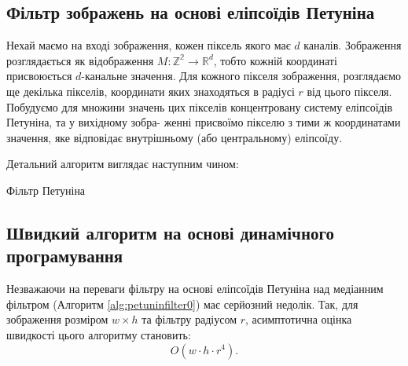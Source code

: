 \subsection{Фільтр зображень на основі еліпсоїдів Петуніна}

Нехай маємо на вході зображення, кожен піксель якого має \(d\) каналів. Зображення розглядається як відображення \(M: \mathbb{Z^2} \rightarrow \mathbb{R}^d\), тобто кожній координаті присвоюється \(d\)-канальне значення. Для кожного пікселя зображення, розглядаємо ще декілька пікселів, координати яких знаходяться в радіусі \(r\) від цього пікселя. Побудуємо для множини значень цих пікселів концентровану систему еліпсоїдів Петуніна, та у вихідному зобра- женні присвоїмо пікселю з тими ж координатами значення, яке відповідає внутрішньому (або центральному) еліпсоїду.

Детальний алгоритм виглядає наступним чином:

\begin{megaalgorithm}[H] \label{alg:petuninfilter0}
	\caption{Фільтр Петуніна}
	
	\BlankLine 
	
		
\end{megaalgorithm}


\subsection{Швидкий алгоритм на основі динамічного програмування}

Незважаючи на переваги фільтру на основі еліпсоїдів Петуніна над медіанним фільтром (Алгоритм \ref{alg:petuninfilter0}) має серйозний недолік. Так, для зображення розміром \(w \times h\) та фільтру радіусом \(r\), асимптотична оцінка швидкості цього алгоритму становить:
\begin{equation*}
O\left( w \cdot h \cdot r^4 \right).
\end{equation*}

